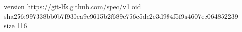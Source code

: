 version https://git-lfs.github.com/spec/v1
oid sha256:997338bb0b7f930ea9e9615b2f689e756c5dc2e3d994f5f9a4607ec064852239
size 116
